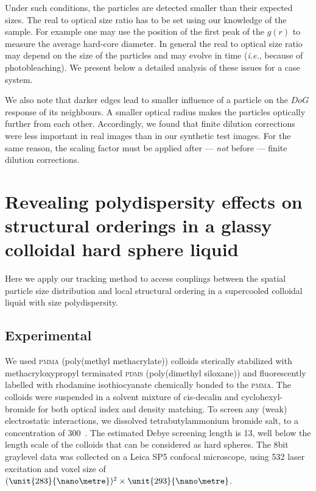 \documentclass[8.5pt,twoside,twocolumn]{article}
\begin{document}
Under such conditions, the particles are detected smaller than their expected sizes. The real to optical size ratio has to be set using our knowledge of the sample. For example one may use the position of the first peak of the $g(r)$ to measure the average hard-core diameter. In general the real to optical size ratio may depend on the size of the particles and may evolve in time (\emph{i.e.}, because of photobleaching). We present below a detailed analysis of these issues for a case system. 

We also note that darker edges lead to smaller influence of a particle on the $DoG$ response of its neighbours. A smaller optical radius makes the particles optically further from each other. Accordingly, we found that finite dilution corrections were less important in real images than in our synthetic test images. For the same reason, the scaling factor must be applied after --- \emph{not} before --- finite dilution corrections.


\section{Revealing polydispersity effects on structural orderings in a glassy colloidal hard sphere liquid}
\label{sec:yon6}

Here we apply our tracking method to access couplings between the spatial particle size distribution and local structural ordering 
in a supercooled colloidal liquid with size polydispersity.  

\subsection{Experimental}
We used \textsc{pmma} (poly(methyl methacrylate)) colloids sterically stabilized with methacryloxypropyl terminated \textsc{pdms} (poly(dimethyl siloxane)) and fluorescently labelled with rhodamine isothiocyanate chemically bonded to the \textsc{pmma}. The colloids were suspended in a solvent mixture of cis-decalin and cyclohexyl-bromide for both optical index and density matching. To screen any (weak) electrostatic interactions, we dissolved tetrabutylammonium bromide salt, to a concentration of \unit{300}{\nano\mole\per\liter}~\citep{royall2005}. The estimated Debye screening length is \unit{13}{\nano\metre}, well below the length scale of the colloids that can be considered as hard spheres. The \unit{8}{bit} graylevel data was collected on a Leica SP5 confocal microscope, using \unit{532}{\nano\meter} laser excitation and voxel size of $(\unit{283}{\nano\metre})^2\times\unit{293}{\nano\metre}$.
\end{document}
